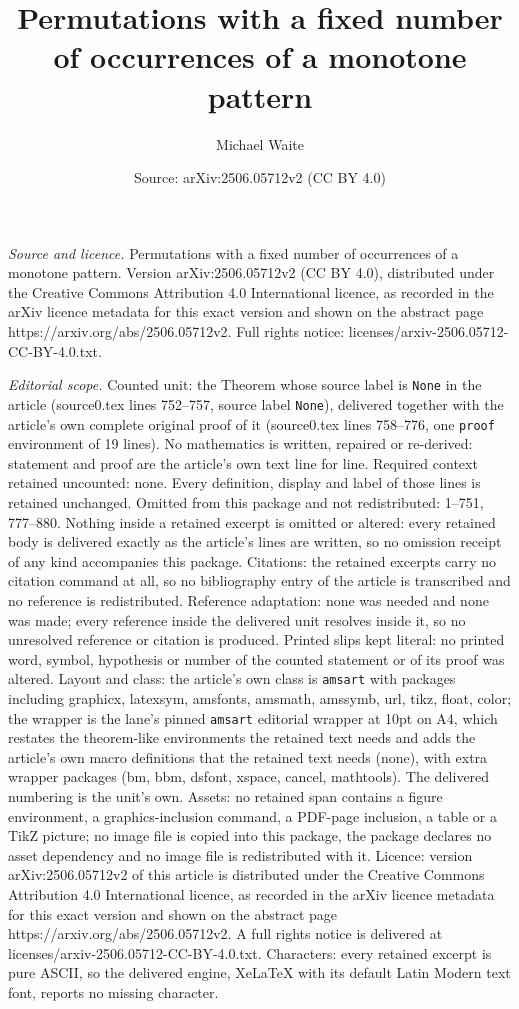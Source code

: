 \documentclass[10pt,a4paper]{amsart}
\title[Permutations with a fixed number of occurrences of a monoton]{Permutations with a fixed number of occurrences of a monotone pattern}
\author{Michael Waite}
\date{Source: arXiv:2506.05712v2 (CC BY 4.0)}
\begin{document}
\maketitle

\noindent\emph{Source and licence.} Permutations with a fixed number of occurrences of a monotone pattern. Version arXiv:2506.05712v2 (CC BY 4.0), distributed under the Creative Commons Attribution 4.0 International licence, as recorded in the arXiv licence metadata for this exact version and shown on the abstract page https://arxiv.org/abs/2506.05712v2. Full rights notice: licenses/arxiv-2506.05712-CC-BY-4.0.txt.\par\smallskip

\noindent\textit{Editorial scope.} Counted unit: the Theorem whose source label is \texttt{None} in the article (source0.tex lines 752--757, source label \texttt{None}), delivered together with the article's own complete original proof of it (source0.tex lines 758--776, one \texttt{proof} environment of 19 lines). No mathematics is written, repaired or re-derived: statement and proof are the article's own text line for line. Required context retained uncounted: none. Every definition, display and label of those lines is retained unchanged. Omitted from this package and not redistributed: 1--751, 777--880. Nothing inside a retained excerpt is omitted or altered: every retained body is delivered exactly as the article's lines are written, so no omission receipt of any kind accompanies this package. Citations: the retained excerpts carry no citation command at all, so no bibliography entry of the article is transcribed and no reference is redistributed. Reference adaptation: none was needed and none was made; every reference inside the delivered unit resolves inside it, so no unresolved reference or citation is produced. Printed slips kept literal: no printed word, symbol, hypothesis or number of the counted statement or of its proof was altered. Layout and class: the article's own class is \texttt{amsart} with packages including graphicx, latexsym, amsfonts, amsmath, amssymb, url, tikz, float, color; the wrapper is the lane's pinned \texttt{amsart} editorial wrapper at 10pt on A4, which restates the theorem-like environments the retained text needs and adds the article's own macro definitions that the retained text needs (none), with extra wrapper packages (bm, bbm, dsfont, xspace, cancel, mathtools). The delivered numbering is the unit's own. Assets: no retained span contains a figure environment, a graphics-inclusion command, a PDF-page inclusion, a table or a TikZ picture; no image file is copied into this package, the package declares no asset dependency and no image file is redistributed with it. Licence: version arXiv:2506.05712v2 of this article is distributed under the Creative Commons Attribution 4.0 International licence, as recorded in the arXiv licence metadata for this exact version and shown on the abstract page https://arxiv.org/abs/2506.05712v2. A full rights notice is delivered at licenses/arxiv-2506.05712-CC-BY-4.0.txt. Characters: every retained excerpt is pure ASCII, so the delivered engine, XeLaTeX with its default Latin Modern text font, reports no missing character.
\end{document}
